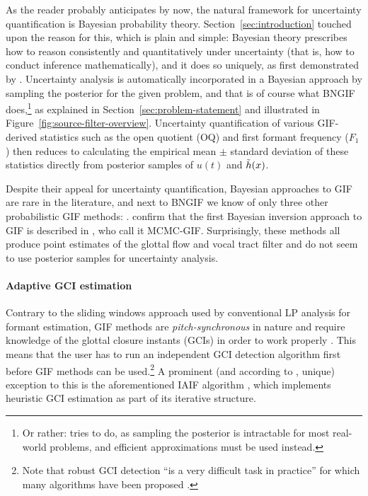 \begin{chaptersections}
As the reader probably anticipates by now, the natural framework for uncertainty quantification is Bayesian probability theory.
Section~\ref{sec:introduction} touched upon the reason for this, which is plain and simple: Bayesian theory prescribes how to reason consistently and quantitatively under uncertainty (that is, how to conduct inference mathematically), and it does so uniquely, as first demonstrated by \cite{Cox1946}.
Uncertainty analysis is automatically incorporated in a Bayesian approach by sampling the posterior for the given problem, and that is of course what BNGIF does,\footnote{%
Or rather: tries to do, as sampling the posterior is intractable for most real-world problems, and efficient approximations must be used instead.
} as explained in Section~\ref{sec:problem-statement} and illustrated in Figure~\ref{fig:source-filter-overview}.
Uncertainty quantification of various GIF-derived statistics such as the open quotient (OQ) and first formant frequency ($F_1$) then reduces to calculating the empirical mean $\pm$ standard deviation of these statistics directly from posterior samples of $u(t)$ and $\tilde{h}(x)$.

Despite their appeal for uncertainty quantification, Bayesian approaches to GIF are rare in the literature, and next to BNGIF we know of only three other probabilistic GIF methods: \cite{Wang2016a,Rao2018,Auvinen2014}.
\cite{Bleyer2017} confirm that the first Bayesian inversion approach to GIF is described in \citep{Auvinen2014}, who call it MCMC-GIF.
Surprisingly, these methods all produce point estimates of the glottal flow and vocal tract filter and do not seem to use posterior samples for uncertainty analysis.%

\paragraph{Adaptive GCI estimation}
Contrary to the sliding windows approach used by conventional LP analysis for formant estimation, GIF methods are \emph{pitch-synchronous} in nature and require knowledge of the glottal closure instants (GCIs) in order to work properly \citep{Drugman2019}.
This means that the user has to run an independent GCI detection algorithm first before GIF methods can be used.\footnote{%
Note that robust GCI detection ``is a very difficult task in practice'' \citep[p.~14]{Alzamendi2017} for which many algorithms have been proposed \citep[see for example,][Sec.~3.3]{Drugman2019}.
}
A prominent (and according to \cite{Chien2017}, unique) exception to this is the aforementioned IAIF algorithm \citep{Alku1992}, which implements heuristic GCI estimation as part of its iterative structure.


\end{chaptersections}
